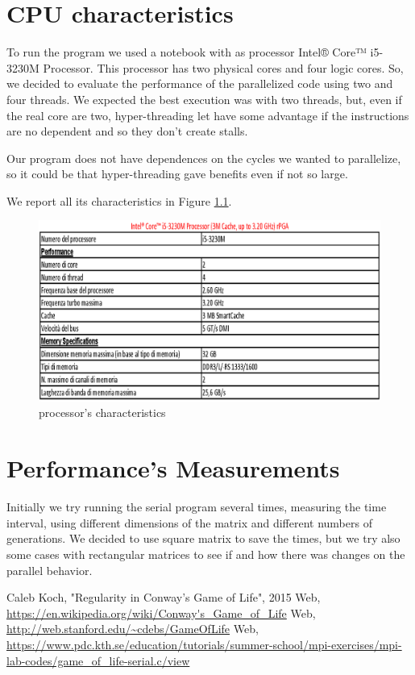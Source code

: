 \documentclass[a4paper,11pt,twoside]{report}
\begin{document}
\chapter{CPU characteristics}
To run the program we used a notebook with as processor Intel® Core™ i5-3230M Processor.
This processor has two physical cores and four logic cores. So, we decided to evaluate the performance of the parallelized code using two and four threads. We expected the best execution was with two threads, but, even if the real core are two, hyper-threading let have some advantage if the instructions are no dependent and so they don't create stalls.

\noindent Our program does not have dependences on the cycles we wanted to parallelize, so it could be that hyper-threading gave benefits even if not so large.

\noindent We report all its characteristics in Figure \ref{fig:2}.

\begin{figure}
	\centering
	\includegraphics[scale = 0.5]{i5.eps}
	\caption{processor's characteristics} \label{fig:2}
\end{figure}





\chapter{Performance's Measurements}
\noindent Initially we try running the serial program several times, measuring the time interval, using different dimensions of the matrix and different numbers of generations.
We decided to use square matrix to save the times, but we try also some cases with rectangular matrices to see if and how there was changes on the parallel behavior.
	





\begin{thebibliography}{9}
 Caleb Koch, "Regularity in Conway's Game of Life", 2015
 Web, \url{https://en.wikipedia.org/wiki/Conway's_Game_of_Life}
 Web, \url{http://web.stanford.edu/~cdebs/GameOfLife}
 Web, \url{https://www.pdc.kth.se/education/tutorials/summer-school/mpi-exercises/mpi-lab-codes/game_of_life-serial.c/view}
\end{thebibliography}
\end{document}
